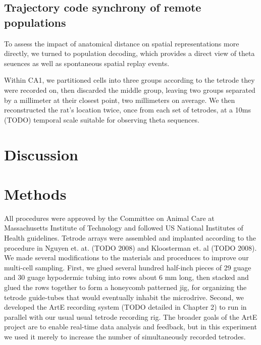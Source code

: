 \documentclass[10pt]{article}
\begin{document}
\subsection*{Trajectory code synchrony of remote populations}
To assess the impact of anatomical distance on spatial representations more directly, we turned to population decoding, which provides a direct view of theta seuences as well as spontaneous spatial replay events. 

Within CA1, we partitioned cells into three groups according to the tetrode they were recorded on, then discarded the middle group, leaving two groups separated by a millimeter at their closest point, two millimeters on average. We then reconstructed the rat's location twice, once from each set of tetrodes, at a 10ms (TODO) temporal scale suitable for observing theta sequences. 

\section*{Discussion}

\cite{Mizuseki 2012}


\section*{Methods}
All procedures were approved by the Committee on Animal Care at Massachusetts Institute of Technology and followed US National Institutes of Health guidelines. Tetrode arrays were assembled and implanted  according to the procedure in Nguyen et. at. (TODO 2008) and Kloosterman et. al (TODO 2008). We made several modifications to the materials and proceduces to improve our multi-cell sampling.  First, we glued several hundred half-inch pieces of 29 guage and 30 guage hypodermic tubing into rows about 6 mm long, then stacked and glued the rows together to form a honeycomb patterned jig, for organizing the tetrode guide-tubes that would eventually inhabit the microdrive. Second, we developed the ArtE recording system (TODO detailed in Chapter 2) to run in parallel with our usual usual tetrode recording rig. The broader goals of the ArtE project are to enable real-time data analysis and feedback, but in this experiment we used it merely to increase the number of simultaneously recorded tetrodes.
\end{document}
